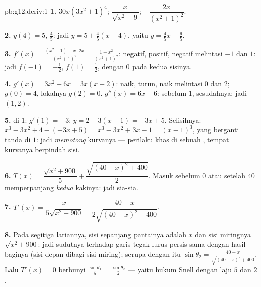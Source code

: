 \begin{solution}{pb:g12:deriv:1}
\textbf{1.} $30x\left(3x^2 + 1\right)^4$; \quad
$\dfrac{x}{\sqrt{x^2 + 9}}$; \quad
$-\dfrac{2x}{\left(x^2 + 1\right)^2}$.

\textbf{2.} $y(4) = 5$,  $\frac45$: jadi 
$y = 5 + \frac45(x - 4)$, yaitu $y = \frac45 x + \frac95$.

\textbf{3.} $f'(x) = \frac{(x^2 + 1) - x \cdot 2x}{(x^2+1)^2}
= \frac{1 - x^2}{(x^2 + 1)^2}$: negatif, positif, negatif
melintasi $-1$ dan $1$: jadi  $f(-1) = -\frac12$, 
$f(1) = \frac12$, dengan  $0$ pada kedua sisinya.

\textbf{4.} $g'(x) = 3x^2 - 6x = 3x(x - 2)$: naik,
turun, naik melintasi $0$ dan $2$; 
$g(0) = 4$,  lokalnya $g(2) = 0$. $g''(x) = 6x - 6$: 
sebelum $1$,  sesudahnya: jadi  $(1, 2)$.

\textbf{5.}  di $1$:  $g'(1) = -3$:
$y = 2 - 3(x - 1) = -3x + 5$. Selisihnya:
$x^3 - 3x^2 + 4 - (-3x + 5) = x^3 - 3x^2 + 3x - 1 =
(x - 1)^3$, yang berganti tanda di $1$: jadi 
\emph{memotong} kurvanya --- perilaku khas di sebuah
, tempat kurvanya berpindah sisi.

\textbf{6.} $T(x) = \dfrac{\sqrt{x^2 + 900}}{5} +
\dfrac{\sqrt{(40 - x)^2 + 400}}{2}$. Masuk sebelum $0$ atau
setelah $40$ memperpanjang \emph{kedua} kakinya: jadi sia-sia.

\textbf{7.} $T'(x) = \dfrac{x}{5\sqrt{x^2 + 900}} -
\dfrac{40 - x}{2\sqrt{(40 - x)^2 + 400}}$.

\textbf{8.} Pada segitiga lariannya, sisi sepanjang pantainya
adalah $x$ dan sisi miringnya $\sqrt{x^2 + 900}$: jadi 
sudutnya terhadap garis tegak lurus persis sama dengan hasil baginya
(sisi depan dibagi sisi miring); serupa dengan itu
$\sin\theta_2 = \frac{40 - x}{\sqrt{(40-x)^2 + 400}}$. Lalu
$T'(x) = 0$ berbunyi
$\frac{\sin\theta_1}{5} = \frac{\sin\theta_2}{2}$ --- yaitu hukum
Snell dengan laju $5$ dan $2$.


\end{solution}
